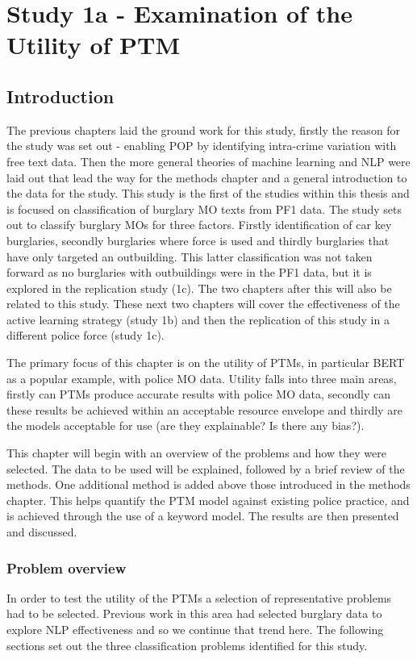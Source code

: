 \chapter{Study 1a - Examination of the Utility of PTM}
\section{Introduction}

The previous chapters laid the ground work for this study, firstly the reason for the study was set out -  enabling POP by identifying intra-crime variation with free text data. Then the more general theories of machine learning and NLP were laid out that lead the way for the methods chapter and a general introduction to the data for the study. This study is the first of the studies within this thesis and is focused on classification of burglary MO texts from PF1 data. The study sets out to classify burglary MOs for three factors. Firstly identification of car key burglaries, secondly burglaries where force is used and thirdly burglaries that have only targeted an outbuilding. This latter classification was not taken forward as no burglaries with outbuildings were in the PF1 data, but it is explored in the replication study (1c). The two chapters after this will also be related to this study. These next two chapters will cover the effectiveness of the active learning strategy (study 1b)  and then the replication of this study in a different police force (study 1c).      

The primary focus of this chapter is on the utility of PTMs, in particular BERT as a popular example, with police MO data. Utility falls into three main areas, firstly can PTMs produce accurate results with police MO data, secondly can these results be achieved within an acceptable resource envelope and thirdly are the models acceptable for use (are they explainable? Is there any bias?). 

This chapter will begin with an overview of the problems and how they were selected. The data to be used will be explained, followed by a brief review of the methods. One additional method is added above those introduced in the methods chapter. This helps quantify the PTM model against existing police practice,  and is achieved through the use of a keyword model. The results are then presented and discussed.

\subsection{Problem overview} In order to test the utility of the PTMs a selection of representative problems had to be selected. Previous work in this area had selected burglary data \parencite{birks, sheard2020developing } to explore NLP effectiveness and so we continue that trend here. The following sections set out the three classification problems identified for this study. 

